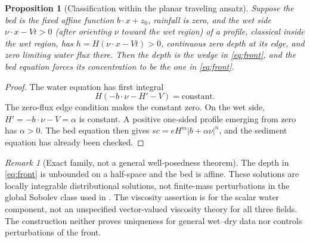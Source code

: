 \documentclass[11pt,a4paper]{article}
\newtheorem{proposition}[theorem]{Proposition}
\theoremstyle{remark}\newtheorem{remark}[theorem]{Remark}
\begin{document}
\begin{proposition}[Classification within the planar traveling ansatz]
Suppose the bed is the fixed affine function $b\cdot x+z_0$, rainfall is zero, and the wet side $\nu\cdot x-Vt>0$ (after orienting $\nu$ toward the wet region) of a profile, classical inside the wet region, has $h=H(\nu\cdot x-Vt)>0$, continuous zero depth at its edge, and zero limiting water flux there. Then the depth is the wedge in \eqref{eq:front}, and the bed equation forces its concentration to be the one in \eqref{eq:front}.
\end{proposition}
\begin{proof}
The water equation has first integral
\[
 H(-b\cdot\nu-H'-V)=\text{constant}.
\]
The zero-flux edge condition makes the constant zero. On the wet side, $H'=-b\cdot\nu-V=\alpha$ is constant. A positive one-sided profile emerging from zero has $\alpha>0$. The bed equation then gives $sc=eH^m|b+\alpha\nu|^n$, and the sediment equation has already been checked.
\end{proof}

\begin{remark}[Exact family, not a general well-posedness theorem]
The depth in \eqref{eq:front} is unbounded on a half-space and the bed is affine. These solutions are locally integrable distributional solutions, not finite-mass perturbations in the global Sobolev class used in \cite{BDN}. The viscosity assertion is for the scalar water component, not an unspecified vector-valued viscosity theory for all three fields. The construction neither proves uniqueness for general wet--dry data nor controls perturbations of the front.
\end{remark}
\end{document}
